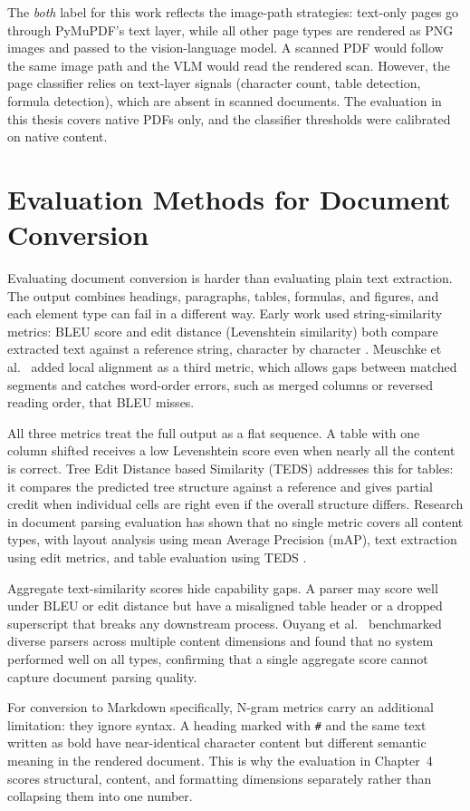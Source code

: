 The \textit{both} label for this work reflects the image-path strategies: text-only pages go through PyMuPDF's text layer, while all other page types are rendered as PNG images and passed to the vision-language model.
A scanned PDF would follow the same image path and the VLM would read the rendered scan.
However, the page classifier relies on text-layer signals (character count, table detection, formula detection), which are absent in scanned documents.
The evaluation in this thesis covers native PDFs only, and the classifier thresholds were calibrated on native content.

\section{Evaluation Methods for Document Conversion}

Evaluating document conversion is harder than evaluating plain text extraction.
The output combines headings, paragraphs, tables, formulas, and figures, and each
element type can fail in a different way. Early work used string-similarity
metrics: BLEU score and edit distance (Levenshtein similarity) both compare
extracted text against a reference string, character by character
\autocite{papineni2002}. Meuschke et al.\ \autocite{meuschke2023} added local
alignment as a third metric, which allows gaps between matched segments and
catches word-order errors, such as merged columns or reversed reading order, that
BLEU misses.

All three metrics treat the full output as a flat sequence. A table with one
column shifted receives a low Levenshtein score even when nearly all the content
is correct. Tree Edit Distance based Similarity (TEDS) addresses this for tables:
it compares the predicted tree structure against a reference and gives partial
credit when individual cells are right even if the overall structure differs.
Research in document parsing evaluation has shown that no single metric covers
all content types, with layout analysis using mean Average Precision (mAP), text
extraction using edit metrics, and table evaluation using TEDS
\autocite{zhong2020, pfitzmann2022}.

Aggregate text-similarity scores hide capability gaps. A parser may score well
under BLEU or edit distance but have a misaligned table header or a dropped
superscript that breaks any downstream process. Ouyang et al.\
\autocite{omnidocbench2025} benchmarked diverse parsers across multiple content
dimensions and found that no system performed well on all types, confirming
that a single aggregate score cannot capture document parsing quality.

For conversion to Markdown specifically, N-gram metrics carry an additional
limitation: they ignore syntax. A heading marked with \texttt{\#} and the same
text written as bold have near-identical character content but different semantic
meaning in the rendered document. This is why the evaluation in Chapter~4 scores
structural, content, and formatting dimensions separately rather than collapsing
them into one number.
